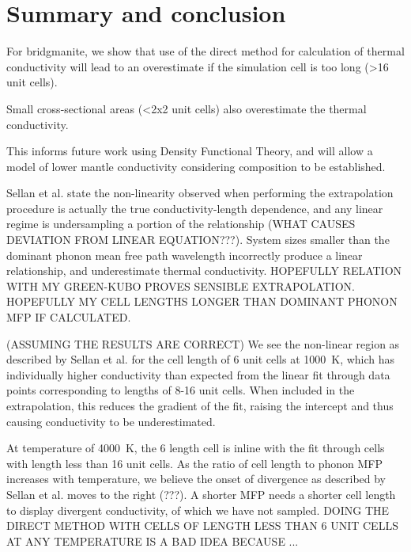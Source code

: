 \documentclass[%
preprint,                                  %
nofootinbib,
 amsmath,amssymb,
 aps,
]{revtex4-1}
\begin{document}
\section{\label{sec:summary}Summary and conclusion}

For bridgmanite, we show that use of the direct method for calculation of thermal conductivity will lead to an overestimate if the simulation cell is too long (\textgreater 16 unit cells).

Small cross-sectional areas (\textless 2x2 unit cells) also overestimate the thermal conductivity.

This informs future work using Density Functional Theory, and will allow a model of lower mantle conductivity considering composition to be established.

Sellan et al. state the non-linearity observed when performing the extrapolation procedure is actually the true conductivity-length dependence, and any linear regime is undersampling a portion of the relationship (WHAT CAUSES DEVIATION FROM LINEAR EQUATION???). System sizes smaller than the dominant phonon mean free path wavelength incorrectly produce a linear relationship, and underestimate thermal conductivity. HOPEFULLY RELATION WITH MY GREEN-KUBO PROVES SENSIBLE EXTRAPOLATION. HOPEFULLY MY CELL LENGTHS LONGER THAN DOMINANT PHONON MFP IF CALCULATED.

(ASSUMING THE RESULTS ARE CORRECT) We see the non-linear region as described by Sellan et al. for the cell length of 6 unit cells at 1000~K, which has individually higher conductivity than expected from the linear fit through data points corresponding to lengths of 8-16 unit cells. When included in the extrapolation, this reduces the gradient of the fit, raising the intercept and thus causing conductivity to be underestimated.

At temperature of 4000~K, the 6 length cell is inline with the fit through cells with length less than 16 unit cells. As the ratio of cell length to phonon MFP increases with temperature, we believe the onset of divergence as described by Sellan et al. moves to the right (???). A shorter MFP needs a shorter cell length to display divergent conductivity, of which we have not sampled. DOING THE DIRECT METHOD WITH CELLS OF LENGTH LESS THAN 6 UNIT CELLS AT ANY TEMPERATURE IS A BAD IDEA BECAUSE ... 
\end{document}
